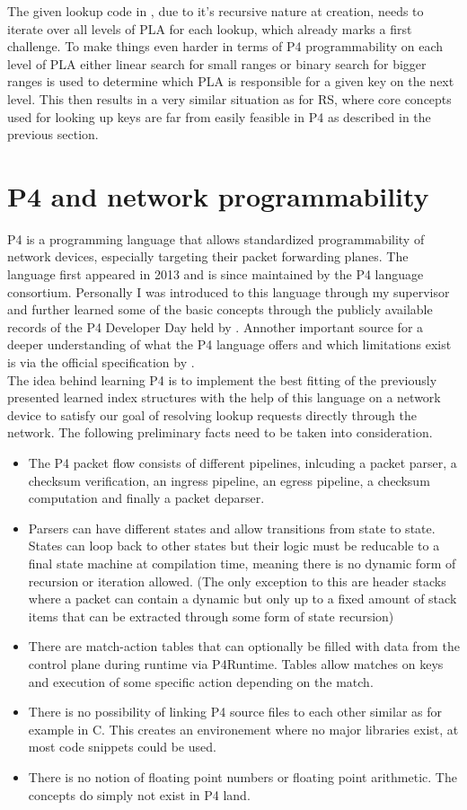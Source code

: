 The given lookup code in \cite{pgm}, due to it's recursive nature at creation, needs to iterate over all levels of PLA for each lookup, which already marks a first challenge. To make things even harder in terms of P4 programmability on each level of PLA either linear search for small ranges or binary search for bigger ranges is used to determine which PLA is responsible for a given key on the next level. This then results in a very similar situation as for RS, where core concepts used for looking up keys are far from easily feasible in P4 as described in the previous section.

\section{P4 and network programmability}
P4 is a programming language that allows standardized programmability of network devices, especially targeting their packet forwarding planes. The language first appeared in 2013 and is since maintained by the P4 language consortium. Personally I was introduced to this language through my supervisor and further learned some of the basic concepts through the publicly available records of the P4 Developer Day held by \cite{p4-devday}. Annother important source for a deeper understanding of what the P4 language offers and which limitations exist is via the official specification by \cite{p4-spec}.\\
The idea behind learning P4 is to implement the best fitting of the previously presented learned index structures with the help of this language on a network device to satisfy our goal of resolving lookup requests directly through the network. The following preliminary facts need to be taken into consideration.

\begin{itemize}
  \item The P4 packet flow consists of different pipelines, inlcuding a packet parser, a checksum verification, an ingress pipeline, an egress pipeline, a checksum computation and finally a packet deparser.
  \item Parsers can have different states and allow transitions from state to state. States can loop back to other states but their logic must be reducable to a final state machine at compilation time, meaning there is no dynamic form of recursion or iteration allowed. (The only exception to this are header stacks where a packet can contain a dynamic but only up to a fixed amount of stack items that can be extracted through some form of state recursion)
  \item There are match-action tables that can optionally be filled with data from the control plane during runtime via P4Runtime. Tables allow matches on keys and execution of some specific action depending on the match.
  \item There is no possibility of linking P4 source files to each other similar as for example in C. This creates an environement where no major libraries exist, at most code snippets could be used.
  \item There is no notion of floating point numbers or floating point arithmetic. The concepts do simply not exist in P4 land.
\end{itemize}

